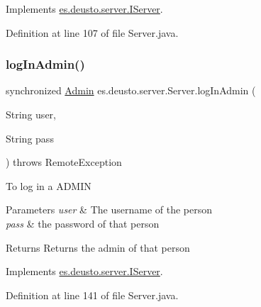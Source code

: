 Implements \hyperlink{interfacees_1_1deusto_1_1server_1_1_i_server_ae6b27c8714c2e2eadc9a55bccb0543fc}{es.\+deusto.\+server.\+I\+Server}.



Definition at line 107 of file Server.\+java.

\mbox{\label{classes_1_1deusto_1_1server_1_1_server_a654d408d0865f8e3f2c931da9e90283a}} 
\subsubsection{\texorpdfstring{log\+In\+Admin()}{logInAdmin()}}
{\footnotesize\ttfamily synchronized \hyperlink{classes_1_1deusto_1_1server_1_1jdo_1_1_admin}{Admin} es.\+deusto.\+server.\+Server.\+log\+In\+Admin (\begin{DoxyParamCaption}\item[{String}]{user,  }\item[{String}]{pass }\end{DoxyParamCaption}) throws Remote\+Exception}

To log in a A\+D\+M\+IN


\begin{DoxyParams}{Parameters}
{\em user} & The username of the person \\
\hline
{\em pass} & the password of that person \\
\hline
\end{DoxyParams}
\begin{DoxyReturn}{Returns}
Returns the admin of that person 
\end{DoxyReturn}


Implements \hyperlink{interfacees_1_1deusto_1_1server_1_1_i_server_a65588c309522410e6a6d9c27d80821a7}{es.\+deusto.\+server.\+I\+Server}.



Definition at line 141 of file Server.\+java.

\mbox{\label{classes_1_1deusto_1_1server_1_1_server_a750bb0d7dbd89246a3602f2e20d03fb5}} 
